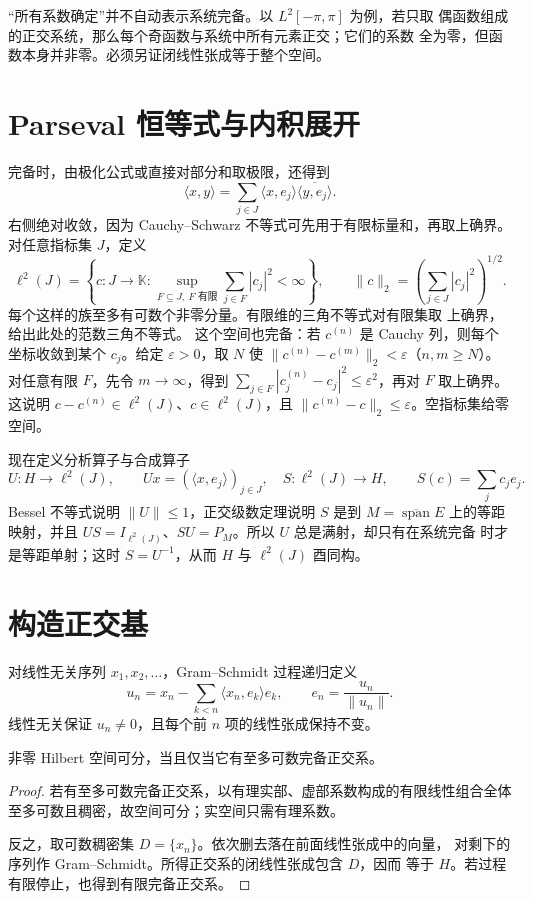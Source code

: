 “所有系数确定”并不自动表示系统完备。以 \(L^2[-\pi,\pi]\) 为例，若只取
偶函数组成的正交系统，那么每个奇函数与系统中所有元素正交；它们的系数
全为零，但函数本身并非零。必须另证闭线性张成等于整个空间。

\section{Parseval 恒等式与内积展开}

完备时，由极化公式或直接对部分和取极限，还得到
\begin{equation}\label{eq:parseval-inner-product}
 \langle x,y\rangle
 =\sum_{j\in J}\langle x,e_j\rangle
          \overline{\langle y,e_j\rangle}.
\end{equation}
右侧绝对收敛，因为 Cauchy--Schwarz 不等式可先用于有限标量和，再取上确界。
对任意指标集 \(J\)，定义
\[
 \ell^2(J)=\left\{c:J\to\mathbb K:
       \sup_{F\subseteq J,\ F\text{ 有限}}\sum_{j\in F}|c_j|^2<\infty\right\},
 \qquad \|c\|_2=\left(\sum_{j\in J}|c_j|^2\right)^{1/2}.
\]
每个这样的族至多有可数个非零分量。有限维的三角不等式对有限集取
上确界，给出此处的范数三角不等式。
这个空间也完备：若 \(c^{(n)}\) 是 Cauchy 列，则每个坐标收敛到某个
\(c_j\)。给定 \(\varepsilon>0\)，取 \(N\) 使
\(\|c^{(n)}-c^{(m)}\|_2<\varepsilon\)（\(n,m\ge N\)）。
对任意有限 \(F\)，先令 \(m\to\infty\)，得到
\(\sum_{j\in F}|c_j^{(n)}-c_j|^2\le\varepsilon^2\)，再对 \(F\) 取上确界。
这说明 \(c-c^{(n)}\in\ell^2(J)\)、\(c\in\ell^2(J)\)，且
\(\|c^{(n)}-c\|_2\le\varepsilon\)。空指标集给零空间。

现在定义分析算子与合成算子
\[
 U:H\to\ell^2(J),\qquad Ux=(\langle x,e_j\rangle)_{j\in J},
 \quad
 S:\ell^2(J)\to H,\qquad S(c)=\sum_jc_je_j.
\]
Bessel 不等式说明 \(\|U\|\le1\)，正交级数定理说明 \(S\) 是到
\(M=\overline{\operatorname{span}}E\) 上的等距映射，并且
\(US=I_{\ell^2(J)}\)、\(SU=P_M\)。所以 \(U\) 总是满射，却只有在系统完备
时才是等距单射；这时 \(S=U^{-1}\)，从而 \(H\) 与 \(\ell^2(J)\) 酉同构。

\section{构造正交基}

对线性无关序列 \(x_1,x_2,\ldots\)，Gram--Schmidt 过程递归定义
\[
 u_n=x_n-\sum_{k<n}\langle x_n,e_k\rangle e_k,
 \qquad e_n=\frac{u_n}{\|u_n\|}.
\]
线性无关保证 \(u_n\ne0\)，且每个前 \(n\) 项的线性张成保持不变。

\begin{theorem}\label{thm:separable-hilbert-basis}
非零 Hilbert 空间可分，当且仅当它有至多可数完备正交系。
\end{theorem}
\begin{proof}
若有至多可数完备正交系，以有理实部、虚部系数构成的有限线性组合全体
至多可数且稠密，故空间可分；实空间只需有理系数。

反之，取可数稠密集 \(D=\{x_n\}\)。依次删去落在前面线性张成中的向量，
对剩下的序列作 Gram--Schmidt。所得正交系的闭线性张成包含 \(D\)，因而
等于 \(H\)。若过程有限停止，也得到有限完备正交系。
\end{proof}

